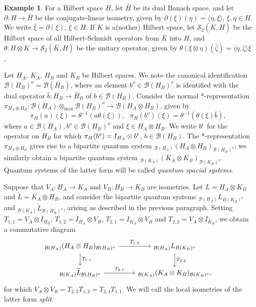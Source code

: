 \documentclass[11pt]{amsart}
\theoremstyle{definition}
\newtheorem{example}[theorem]{Example}
\newcommand{\cl}[1]{\mathcal{#1}}
\newcommand{\ten}{\otimes}
\providecommand{\wt}[1]{\widetilde{#1}}
\begin{document}
\begin{example}\label{ex_findimset}
For a Hilbert space $H$, let $\bar{H}$ be its dual Banach space, 
and let $\partial : H\to \bar{H}$ be the conjugate-linear isometry, 
given by $\partial(\xi)(\eta) = \langle\eta,\xi\rangle$, $\xi,\eta \in H$. 
We write $\bar{\xi} = \partial(\xi)$, $\xi\in H$. 
If $K$ is a(nother) Hilbert space, let 
$\cl S_2(\bar{K},H)$ be the Hilbert 
space of all Hilbert-Schmidt operators from $\bar{K}$ into $H$, and 
$\theta: H\otimes K\to \cl S_2(\bar{K},H)$ be the unitary operator, 
given by 
$\theta(\xi\otimes\eta)(\bar{\zeta}) = \langle \eta,\zeta\rangle \xi$. 

Let $H_A$, $K_A$, $H_B$ and $K_B$ be Hilbert spaces.
We note the canonical identification $\cl B(H_B)^o = \cl B(\bar{H}_B)$,
where an element $b^o\in \cl B(H_B)^o$ is identified 
with the dual operator $\bar{b} : \bar{H}_B\to \bar{H}_B$
of $b\in \cl B(H_B)$.
Consider the normal *-representation 
$\pi_{H_A\otimes H_B} : 
\cl B(H_A)\otimes_{\max}\cl B(H_B)^o \to \cl B(H_A\otimes H_B)$, given by 
$$\pi_H(a)(\xi) = \theta^{-1}(a\theta(\xi)), \ \ \ 
\pi_H(b^o)(\xi) = \theta^{-1}(\theta(\xi)\bar{b}),$$ 
where $a\in \cl B(H_A), b^o\in \cl B(H_B)^o$ and $\xi\in H_A\otimes H_B$.
We write $b^{\rm t}$ for the operator on $H_B$ for which 
$\pi_H(b^o) = I_{H_A}\otimes b^{\rm t}$, $b\in \cl B(H_B)$. 
The *-representation $\pi_{H_A\otimes H_B}$ 
gives rise to a bipartite quantum system
$_{\cl B(H_A)}(H_A\otimes H_B)_{\cl B(H_B)^{o}}$; we similarly obtain  
a bipartite quantum system 
$_{\cl B(K_A)}(K_A\otimes K_B)_{\cl B(K_B)^{o}}$. 
Quantum systems of the latter form will be called 
\emph{quantum spacial systems}.

Suppose that $V_A:H_A\to K_A$ and $V_B:H_B\to K_B$ are isometries. 
Let $L = H_A\ten K_B$ and $\wt{L} = K_A\otimes H_B$, 
and consider the bipartite quantum systems 
$_{\cl B(H_A)}{L}_{B(K_B)^{o}}$ and 
$_{\cl B(K_A)}\wt{L}_{\cl B(H_B)^{o}}$, 
arising as described in the previous paragraph. 
Setting 
$T_{1,1} = V_A\otimes I_{H_B}$, 
$T_{1,2} = I_{H_A}\ten V_B$, $T_{2,1} = I_{K_A}\otimes V_B$ and 
$T_{2,2} = V_A\otimes I_{K_B}$, we 
obtain a commutative diagram 
\begin{equation}\label{eq_diag1}
\begin{tikzcd}
_{\cl B(H_A)}(H_A\otimes H_B)_{\cl B(H_B)^{o}} \arrow[d, "T_{1,1}"] \arrow[r, "T_{1,2}"] 
& _{\cl B(H_A)}L_{B(K_B)^{o}}\arrow[d, "T_{2,2}"]\\
_{\cl B(K_A)}\wt{L}_{\cl B(H_B)^{o}} \arrow[r, "T_{2,1}"] & 
_{\cl B(K_A)}(K_A\otimes K_B)_{\cl B(K_B)^{o}}, 
\end{tikzcd}
\end{equation}
for which $V_A\otimes V_B = T_{2,2}T_{1,2} = T_{2,1}T_{1,1}$. 
We will call the local isometries of the latter form \emph{split}. 
\end{example}
\end{document}

